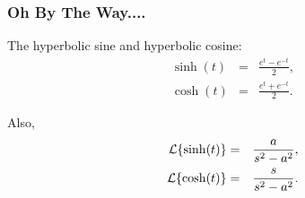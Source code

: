\begin{frame}
  \frametitle{Oh By The Way....}

  \begin{definition}
    The hyperbolic sine and hyperbolic cosine:
    \begin{eqnarray*}
      \sinh(t) & = & \frac{e^t-e^{-t}}{2}, \\
      \cosh(t) & = & \frac{e^t+e^{-t}}{2}.
    \end{eqnarray*}
  \end{definition}

  {
    Also,
    \begin{eqnarray*}
      \laplace{\sinh(t)} & = & \frac{a}{s^2-a^2}, \\
      \laplace{\cosh(t)} & = & \frac{s}{s^2-a^2}.
    \end{eqnarray*}
  }

  
\end{frame}




